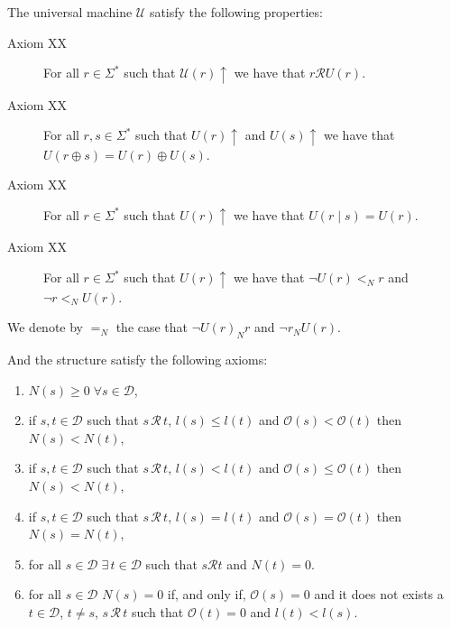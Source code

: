 The universal machine $\mathcal{U}$ satisfy the following properties:

\vskip 0.25cm

\begin{description}
\item[Axiom XX] For all $r \in \Sigma^\ast$ such that $\mathcal{U}(r) \uparrow$ we have that $r \mathcal{R} U(r)$.
\item[Axiom XX] For all $r, s \in \Sigma^\ast$ such that $U(r) \uparrow$ and $U(s) \uparrow$ we have that $U(r \oplus s) = U(r) \oplus U(s)$.
\item[Axiom XX] For all $r \in \Sigma^\ast$ such that $U(r) \uparrow$ we have that $U(r \mid s) = U(r)$.
\item[Axiom XX] For all $r \in \Sigma^\ast$ such that $U(r) \uparrow$ we have that $\lnot U(r) <_N r$ and $\lnot r <_N U(r)$.
\end{description}

We denote by $=_N$ the case that $\lnot U(r) _N r$ and $\lnot r _N U(r)$.

\vskip 0.25cm

And the structure satisfy the following axioms:

\smallskip

\begin{enumerate}[label=(\roman*)]

\item $N(s) \geq 0 \; \forall s \in \mathcal{D}$,

\item if $s, t \in \mathcal{D}$ such that $s \, \mathcal{R} \, t$, $l(s) \leq l(t)$ and $\mathcal{O} (s) < \mathcal{O} (t)$ then $N(s) < N(t)$,

\item if $s, t \in \mathcal{D}$ such that $s \, \mathcal{R} \, t$, $l(s) < l(t)$ and $\mathcal{O} (s) \leq \mathcal{O} (t)$ then $N(s) < N(t)$,

\item if $s, t \in \mathcal{D}$ such that $s \, \mathcal{R} \, t$, $l(s) = l(t)$ and $\mathcal{O} (s) = \mathcal{O} (t)$ then $N(s) = N(t)$,

\item for all $s \in \mathcal{D} \; \exists \, t \in \mathcal{D}$ such that $s \mathcal{R} t$ and $N(t) = 0$.

\item for all $s \in \mathcal{D}$ $N(s) = 0$  if, and only if, $\mathcal{O} (s) = 0$
and it does not exists a $t \in \mathcal{D}$, $t \neq s$, $s \, \mathcal{R} \, t$  such that $\mathcal{O} (t) = 0$ and $l(t) < l(s)$.

\end{enumerate}

